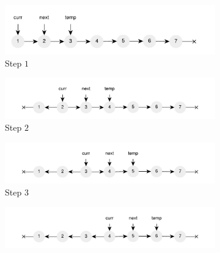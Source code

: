 

\begin{figure}
	\vspace*{-0.5in}
	\centering
	\begin{subfigure}[t]{0.49\textwidth}
		\centering
		\includegraphics[width=\textwidth]{sources/list_reverse/images/list_reverse_iterative1}
		\caption[]{Step $1$}
		\label{fig:list_reverse:list_reverse_iterative1}
	 \end{subfigure}
	\hfill
	\begin{subfigure}[t]{0.49\textwidth}
		\centering
		\includegraphics[width=\textwidth]{sources/list_reverse/images/list_reverse_iterative2}
		\caption[]{Step $2$}
		\label{fig:list_reverse:list_reverse_iterative2}
	 \end{subfigure}
	 \hfill
	 \begin{subfigure}[t]{0.49\textwidth}
		\centering
		\includegraphics[width=\textwidth]{sources/list_reverse/images/list_reverse_iterative3}
		\caption[]{Step $3$}
		\label{fig:list_reverse:list_reverse_iterative3}
	 \end{subfigure}
	 \hfill
	 \begin{subfigure}[t]{0.49\textwidth}
		\centering
		\includegraphics[width=\textwidth]{sources/list_reverse/images/list_reverse_iterative4}

\end{subfigure}
\end{figure}
